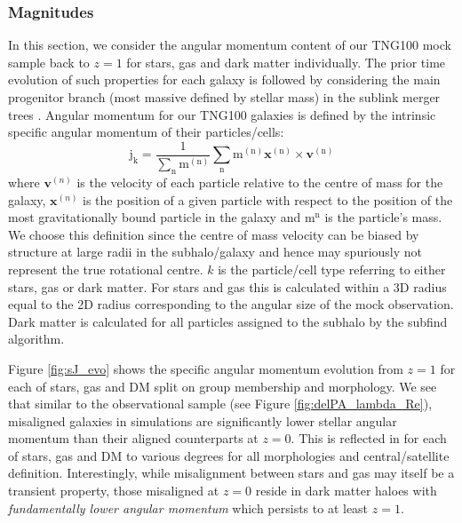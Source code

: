 \subsubsection{Magnitudes}
In this section, we consider the angular momentum content of our TNG100 mock sample back to $z=1$ for stars, gas and dark matter individually. The prior time evolution of such properties for each galaxy is followed by considering the main progenitor branch (most massive defined by stellar mass) in the sublink merger trees \citep{rgomez2015}. Angular momentum for our TNG100 galaxies is defined by the intrinsic specific angular momentum of their particles/cells:
\begin{equation}
\mathrm{j_{k} = \frac{1}{\sum_{n} m^{(n)}} \sum_{n} m^{(n)}\boldsymbol{x}^{(n)} \times \boldsymbol{v}^{(n)}}
\end{equation}
where $\boldsymbol{v}^{(n)}$ is the velocity of each particle relative to the centre of mass for the galaxy, $\boldsymbol{x}^{(n)}$ is the position of a given particle with respect to the position of the most gravitationally bound particle in the galaxy and $\mathrm{m^{n}}$ is the particle's mass. We choose this definition since the centre of mass velocity can be biased by structure at large radii in the subhalo/galaxy and hence may spuriously not represent the true rotational centre. $k$ is the particle/cell type referring to either stars, gas or dark matter. For stars and gas this is calculated within a 3D radius equal to the 2D radius corresponding to the angular size of the mock observation. Dark matter is calculated for all particles assigned to the subhalo by the subfind algorithm. 

Figure \ref{fig:sJ_evo} shows the specific angular momentum evolution from $z=1$ for each of stars, gas and DM split on group membership and morphology. We see that similar to the observational sample (see Figure \ref{fig:delPA_lambda_Re}), misaligned galaxies in simulations are significantly lower stellar angular momentum than their aligned counterparts at $z=0$. This is reflected in for each of stars, gas and DM to various degrees for all morphologies and central/satellite definition. Interestingly, while misalignment between stars and gas may itself be a transient property, those misaligned at $z = 0$ reside in dark matter haloes with \textit{fundamentally lower angular momentum} which persists to at least $z = 1$. 

